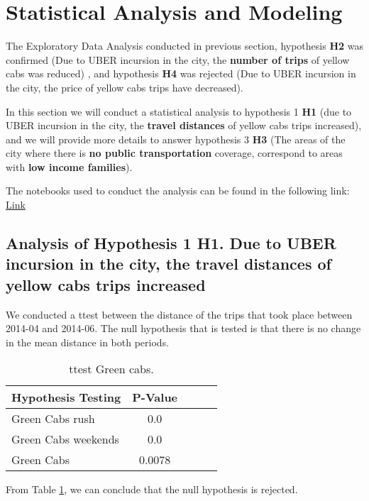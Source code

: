 \section{Statistical Analysis and Modeling}
\label{sec:StatAnalisys}

The Exploratory Data Analysis conducted in previous section, hypothesis \textbf{H2} was confirmed (Due to UBER incursion in the city, the \textbf{number of trips} of yellow cabs was reduced) , and hypothesis \textbf{H4} was rejected (Due to UBER incursion in the city, the price of yellow cabs trips have decreased).

In this section we will conduct a statistical analysis to hypothesis 1 \textbf{H1} (due to UBER incursion in the city, the \textbf{travel distances} of yellow cabs trips increased), and we will provide more details to answer hypothesis 3 \textbf{H3} (The areas of the city where there is \textbf{no public transportation} coverage, correspond to areas with \textbf{low income families}). 

The notebooks used to conduct the analysis can be found in the following link: 
\href{https://marioceron-case-51.s3.amazonaws.com/datathon_html/Models_Demographics.html}{Link}


\subsection{Analysis of Hypothesis 1 \textbf{H1}. Due to UBER incursion in the city, the \textbf{travel distances} of yellow cabs trips increased}
We conducted a ttest between the distance of the trips that took place between 2014-04 and 2014-06.  The null hypothesis that is tested is that there is no change in the mean distance in both periods.

\begin{table}[h]
\begin{center}
\begin{tabular}{lclcl}
\hline
\textbf{Hypothesis Testing}  & \textbf{P-Value}   \\
\hline
Green Cabs rush & 0.0 \\
 Green Cabs weekends  &  0.0  \\
Green Cabs  & 0.0078 \\
\hline
\end{tabular}
\caption{ttest Green cabs.}
\label{tab:ttestGreen}
\end{center}
\end{table}


From Table \ref{tab:ttestGreen}, we can conclude that the null hypothesis is rejected. 


